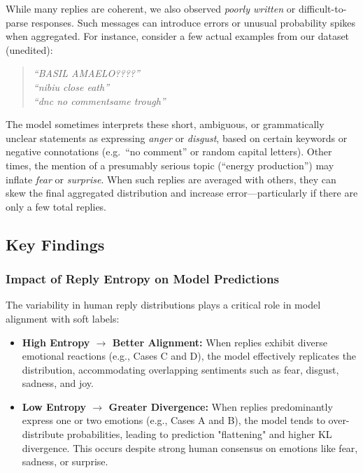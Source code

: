 While many replies are coherent, we also observed \emph{poorly written} or difficult-to-parse responses. Such messages can introduce errors or unusual probability spikes when aggregated. For instance, consider a few actual examples from our dataset (unedited):

\begin{quote}
\emph{``BASIL AMAELO????''} \\
\emph{``nibiu close eath''} \\
\emph{``dnc no commentsame trough''} \\
\end{quote}

The model sometimes interprets these short, ambiguous, or grammatically unclear statements as expressing \textit{anger} or \textit{disgust}, based on certain keywords or negative connotations (e.g.\ ``no comment'' or random capital letters). Other times, the mention of a presumably serious topic (``energy production'') may inflate \textit{fear} or \textit{surprise}. When such replies are averaged with others, they can skew the final aggregated distribution and increase error—particularly if there are only a few total replies.

\bigskip


\subsection{Key Findings}
\subsubsection*{Impact of Reply Entropy on Model Predictions}
The variability in human reply distributions plays a critical role in model alignment with soft labels:
\begin{itemize}
    \item \textbf{High Entropy $\rightarrow$ Better Alignment:} When replies exhibit diverse emotional reactions (e.g., Cases C and D), the model effectively replicates the distribution, accommodating overlapping sentiments such as fear, disgust, sadness, and joy.
    \item \textbf{Low Entropy $\rightarrow$ Greater Divergence:} When replies predominantly express one or two emotions (e.g., Cases A and B), the model tends to over-distribute probabilities, leading to prediction "flattening" and higher KL divergence. This occurs despite strong human consensus on emotions like fear, sadness, or surprise.
\end{itemize}

